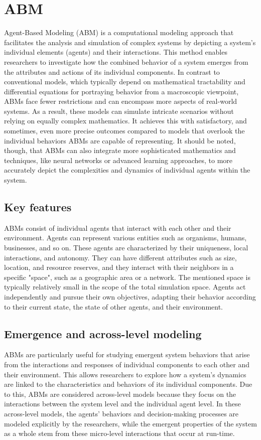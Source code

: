 \section{ABM}
    Agent-Based Modeling (ABM) is a computational modeling approach that facilitates the analysis and simulation of complex systems by depicting a system's individual elements (agents) and their interactions\cite{railsback2019agent}. This method enables researchers to investigate how the combined behavior of a system emerges from the attributes and actions of its individual components. In contrast to conventional models, which typically depend on mathematical tractability and differential equations for portraying behavior from a macroscopic viewpoint, ABMs face fewer restrictions and can encompass more aspects of real-world systems\cite{bonabeau2002agent}. As a result, these models can simulate intricate scenarios without relying on equally complex mathematics. It achieves this with satisfactory, and sometimes, even more precise outcomes compared to models that overlook the individual behaviors ABMs are capable of representing. It should be noted, though, that ABMs can also integrate more sophisticated mathematics and techniques, like neural networks or advanced learning approaches, to more accurately depict the complexities and dynamics of individual agents within the system.

\subsection{Key features}
    ABMs consist of individual agents that interact with each other and their environment. Agents can represent various entities such as organisms, humans, businesses, and so on. These agents are characterized by their uniqueness, local interactions, and autonomy. They can have different attributes such as size, location, and resource reserves, and they interact with their neighbors in a specific "space", such as a geographic area or a network\cite{railsback2019agent}. The mentioned space is typically relatively small in the scope of the total simulation space. Agents act independently and pursue their own objectives, adapting their behavior according to their current state, the state of other agents, and their environment.

\subsection{Emergence and across-level modeling}
    ABMs are particularly useful for studying emergent system behaviors that arise from the interactions and responses of individual components to each other and their environment. This allows researchers to explore how a system's dynamics are linked to the characteristics and behaviors of its individual components. Due to this, ABMs are considered across-level models because they focus on the interactions between the system level and the individual agent level\cite{railsback2019agent}. In these across-level models, the agents' behaviors and decision-making processes are modeled explicitly by the researchers, while the emergent properties of the system as a whole stem from these micro-level interactions that occur at run-time.

